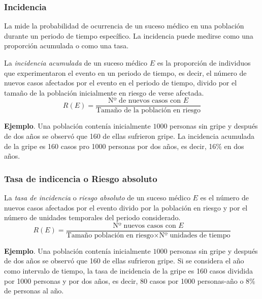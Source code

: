 \begin{frame}
\frametitle{Incidencia}
La  mide la probabilidad de ocurrencia de un suceso médico en una población durante un periodo de tiempo específico.
La incidencia puede medirse como una proporción acumulada o como una tasa.

\begin{definicion}
La \emph{incidencia acumulada} de un suceso médico $E$ es la proporción de individuos que experimentaron el evento en un periodo de tiempo, es decir, el número de nuevos casos afectados por el evento en el periodo de tiempo, divido por el tamaño de la población inicialmente en riesgo de verse afectada. 
\[
  R(E)=\frac{\mbox{Nº de nuevos casos con $E$}}{\mbox{Tamaño de la población en riesgo}}
\]
\end{definicion}

\textbf{Ejemplo}. Una población contenía inicialmente $1000$ personas sin gripe y después de dos años se observó que 160 de ellas sufrieron gripe.
La incidencia acumulada de la gripe es 160 casos pro 1000 personas por dos años, es decir, 16\% en dos años.
\end{frame}
  

\begin{frame}
\frametitle{Tasa de indicencia o Riesgo absoluto}
  
\begin{definicion}
La \emph{tasa de incidencia} o \emph{riesgo absoluto} de un suceso médico $E$ es el número de nuevos casos afectados por el evento divido por la población en riesgo y por el número de unidades temporales del periodo considerado.
\[
  R(E)=\frac{\mbox{Nº nuevos casos con $E$}}{\mbox{Tamaño población en riesgo}\times \mbox{Nº unidades de tiempo}}
\]
\end{definicion}

\textbf{Ejemplo}. Una población contenía inicialmente $1000$ personas sin gripe y después de dos años se observó que 160 de ellas sufrieron gripe.
Si se considera el año como intervalo de tiempo, la tasa de incidencia de la gripe es 160 casos dividida por 1000 personas y por dos años, es decir, 80 casos por 1000 personas-año o 8\% de personas al año.
\end{frame}


